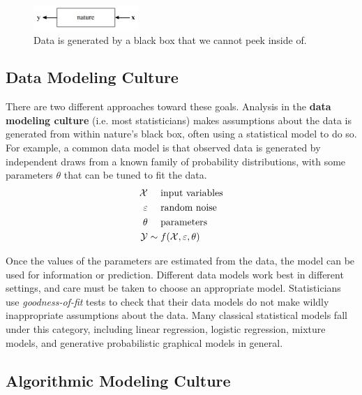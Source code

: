 \documentclass{discussion}
\begin{document}
\begin{figure}[h!]
    \centering
    \includegraphics[width=150px]{images/nature-black-box}
    \caption{Data is generated by a black box that we cannot peek inside of.}
    \label{fig:nature-black-box}
\end{figure}

\subsection*{Data Modeling Culture}

There are two different approaches toward these goals.  Analysis in the \textbf{data modeling culture} (i.e. most statisticians) makes assumptions about the data is generated from within nature's black box, often using a statistical model to do so.  For example, a common data model is that observed data is generated by independent draws from a known family of probability distributions, with some parameters $\theta$ that can be tuned to fit the data.
%
\begin{align*}
    \mathcal{X} &\quad \text{ input variables} \\
    \varepsilon &\quad \text{ random noise} \\
    \theta &\quad \text{ parameters} \\
    \mathcal{Y} &\sim f(\mathcal{X}, \varepsilon, \theta)
\end{align*}

Once the values of the parameters are estimated from the data, the model can be used for information or prediction.  Different data models work best in different settings, and care must be taken to choose an appropriate model.  Statisticians use \textit{goodness-of-fit} tests to check that their data models do not make wildly inappropriate assumptions about the data.  Many classical statistical models fall under this category, including linear regression, logistic regression, mixture models, and generative probabilistic graphical models in general.

\subsection*{Algorithmic Modeling Culture}
\end{document}
